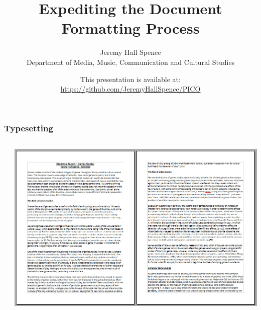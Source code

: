 \documentclass[aspectratio = 169]{beamer}
\title{Expediting the Document Formatting Process}
\author{Jeremy Hall Spence \\ Department of Media, Music, Communication and Cultural Studies}
\date{This presentation is available at: \\ \href{https://github.com/JeremyHallSpence/PICO}{\underline{https://github.com/JeremyHallSpence/PICO}}}
\begin{document}

\begin{frame}

\maketitle

\end{frame}




\begin{frame}
\label{introI}
\frametitle{Typesetting}

\begin{columns}


\hyperlink{introI}{} \newline
\hyperlink{introII}{} \newline 
\hyperlink{scoping}{} \newline
\hyperlink{elaboration}{} \newline  
\hyperlink{software}{} \newline 
\hyperlink{toolchain}{} \newline 
\hyperlink{learning}{} \newline 
\hyperlink{problems}{} \newline 
\hyperlink{results}{} \newline
\hyperlink{exampleI}{} \newline 
\hyperlink{exampleII}{}  


\begin{center}
\includegraphics[scale = 0.4]{untypeset}
\end{center}

\end{columns}
\end{frame}
\end{document}
